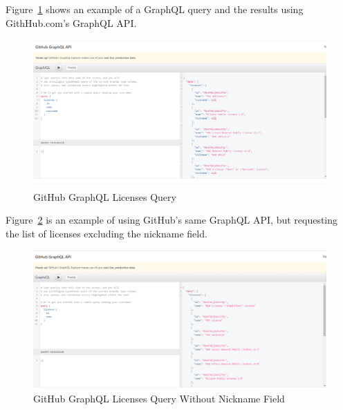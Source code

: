 Figure~\ref{f:github-graphql-1} shows an example of a GraphQL query and the
results using GithHub.com's GraphQL API.  
\begin{figure}[!ht]
  \centering\includegraphics[width=\columnwidth]{images/github-graphql-1.png}
  \caption{GitHub GraphQL Licenses Query}\label{f:github-graphql-1}
\end{figure}
Figure~\ref{f:github-graphql-2} is an
example of using GitHub's same GraphQL API, but requesting the list of licenses
excluding the nickname field.
\begin{figure}[!ht]
  \centering\includegraphics[width=\columnwidth]{images/github-graphql-2.png}
  \caption{GitHub GraphQL Licenses Query Without Nickname Field}\label{f:github-graphql-2}
\end{figure}

